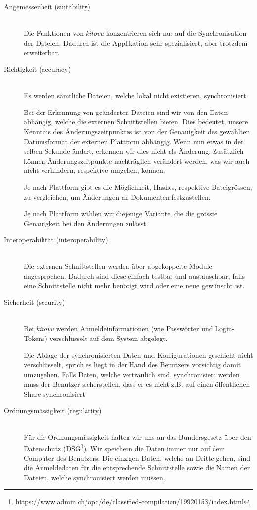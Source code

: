 \documentclass[a4paper]{article}
\begin{document}
\begin{description}
  \item[Angemessenheit (suitability)] \strut \\
    Die Funktionen von \emph{kitovu} konzentrieren sich nur auf die Synchronisation der Dateien.
    Dadurch ist die Applikation sehr spezialisiert, aber trotzdem erweiterbar.
  \item[Richtigkeit (accuracy)] \strut \\
    Es werden sämtliche Dateien, welche lokal nicht existieren, synchronisiert.

    Bei der Erkennung von geänderten Dateien sind wir von den Daten abhängig, welche die externen Schnittstellen bieten.
    Dies bedeutet, unsere Kenntnis des Änderungszeitpunktes ist von der Genauigkeit des gewählten Datumsformat der externen Plattform abhängig.
    Wenn nun etwas in der selben Sekunde ändert, erkennen wir dies nicht als Änderung.
    Zusätzlich können Änderungszeitpunkte nachträglich verändert werden, was wir auch nicht verhindern, respektive umgehen, können.
    
    Je nach Plattform gibt es die Möglichkeit, Hashes, respektive Dateigrössen, zu vergleichen, um Änderungen an Dokumenten festzustellen.
    
    Je nach Plattform wählen wir diejenige Variante, die die grösste Genauigkeit bei den Änderungen zulässt.
  \item[Interoperabilität (interoperability)] \strut \\
    Die externen Schnittstellen werden über abgekoppelte Module angesprochen.
    Dadurch sind diese einfach testbar und austauschbar, falls eine Schnittstelle nicht mehr benötigt wird oder eine neue gewünscht ist.
  \item[Sicherheit (security)] \strut \\
    Bei \emph{kitovu} werden Anmeldeinformationen (wie Passwörter und Login-Tokens) verschlüsselt auf dem System abgelegt.

    Die Ablage der synchronisierten Daten und Konfigurationen geschieht nicht verschlüsselt, sprich es liegt in der Hand des Benutzers vorsichtig damit umzugehen.
    Falls Daten, welche vertraulich sind, synchronisiert werden muss der Benutzer sicherstellen, dass er es nicht z.B. auf einen öffentlichen Share synchronisiert.
  \item[Ordnungsmässigkeit (regularity)] \strut \\
    Für die Ordnungsmässigkeit halten wir uns an das Bundersgesetz über den Datenschutz (DSG\footnote{\url{https://www.admin.ch/opc/de/classified-compilation/19920153/index.html}}).
    Wir speichern die Daten immer nur auf dem Computer des Benutzers.
    Die einzigen Daten, welche an Dritte gehen, sind die Anmeldedaten für die entsprechende Schnittstelle sowie die Namen der Dateien, welche synchronisiert werden müssen.


\end{description}
\end{document}
